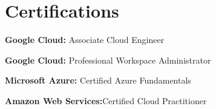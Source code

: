 \documentclass[letterpaper,11pt]{article}
\newcommand{\resumeSubHeadingListStart}{\begin{itemize}[leftmargin=0.0in, label={}]}
\newcommand{\resumeSubHeadingListEnd}{\end{itemize}}
\begin{document}
\section{Certifications}
  \vspace{2pt}
  \resumeSubHeadingListStart
    \small{\item{
        \textbf{Google Cloud: }{Associate Cloud Engineer} \\ \vspace{3pt}

        \textbf{Google Cloud: }{Professional Workspace Administrator} \\ \vspace{3pt}
    
        \textbf{Microsoft Azure:} {Certified Azure Fundamentals} \\ \vspace{3pt}
        
        \textbf{Amazon Web Services:}{Certified Cloud Practitioner} \\ \vspace{3pt}

    }}
  \resumeSubHeadingListEnd
\end{document}
